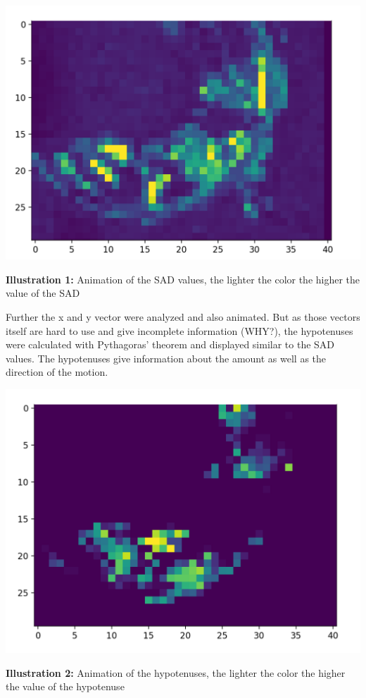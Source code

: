 \documentclass[12pt, a4paper]{report}
\begin{document}
\bigskip

\noindent
\begin{center}
\includegraphics[scale=0.4]{Images/animation_sad.png}

{\bf Illustration 1:}  Animation of the SAD values, the lighter the color the higher the value of the SAD
\end{center}

\bigskip
 
Further the x and y vector were analyzed and also animated. But as those vectors itself are hard to use and give incomplete information (WHY?), the hypotenuses were calculated with Pythagoras' theorem and displayed similar to the SAD values. The hypotenuses give information about the amount as well as the direction of the motion.
 
 \bigskip

\noindent
\begin{center}
\includegraphics[scale=0.4]{Images/animation_hypotenuse.png}

{\bf Illustration 2:}  Animation of the hypotenuses, the lighter the color the higher the value of the hypotenuse
\end{center}
\end{document}
